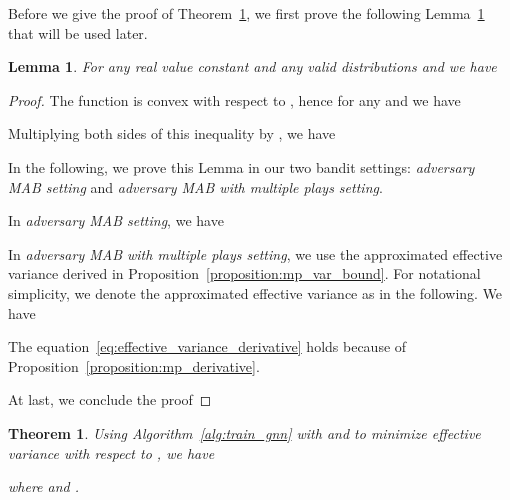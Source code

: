 \documentclass{article}
\newtheorem{theorem}{Theorem}
\newtheorem{lemma}{Lemma}
\begin{document}
Before we give the proof of Theorem~\ref{theorem:bs},
we first prove the following Lemma~\ref{lemma:1} that
will be used later.
\begin{lemma}\label{lemma:1}
	For any real value constant  and any valid distributions  and  we have
		
\end{lemma}
\begin{proof}
The function  is convex with respect to , hence for any  and  we have


Multiplying both sides of this inequality by , we have


In the following, we prove this Lemma in our two bandit settings: \textit{adversary MAB setting} and \textit{adversary MAB with multiple plays setting}.

In \textit{adversary MAB setting}, we have


In \textit{adversary MAB with multiple plays setting}, we use the approximated effective variance  derived in Proposition~\ref{proposition:mp_var_bound}. For notational simplicity, we denote the approximated effective variance as  in the following. We have

The equation~\eqref{eq:effective_variance_derivative} holds because of Proposition~\ref{proposition:mp_derivative}.

At last, we conclude the proof

\end{proof}


\begin{theorem}\label{theorem:bs}
	Using Algorithm~\ref{alg:train_gnn} with  and  to minimize effective variance with respect to , we have 
	
	where  and .
\end{theorem}
\end{document}
